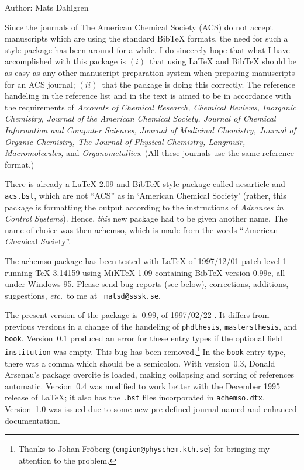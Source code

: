 \documentclass{article}
\begin{document}
\label{achemsodoc}Author: Mats Dahlgren

Since the journals of The American Chemical Society (ACS) do not accept
manuscripts which are using the standard BibTeX formats, the need for such a
style package has been around for a while. I do sincerely hope that what I
have accomplished with this package is $(i)$~that using \LaTeX{} and BibTeX
should be as easy as any other manuscript preparation system when preparing
manuscripts for an ACS journal; $(ii)$~that the package is doing this
correctly. The reference handeling in the reference list and in the text is
aimed to be in accordance with the requirements of \textit{Accounts of
Chemical Research, Chemical Reviews, Inorganic Chemistry, Journal of the
American Chemical Society, Journal of Chemical Information and Computer
Sciences, Journal of Medicinal Chemistry, Journal of Organic Chemistry, The
Journal of Physical Chemistry, Langmuir, Macromolecules,} and \textit{%
Organometallics}. (All these journals use the same reference format.)

There is already a LaTeX 2.09 and BibTeX style package called \textsf{%
acsarticle} and \texttt{acs.bst}, which are not ``ACS'' as in `American
Chemical Society' (rather, this package is formatting the output according
to the instructions of \textit{Advances in Control Systems}). Hence, \textit{%
this} new package had to be given another name. The name of choice was then 
\textsf{achemso}, which is made from the words ``\textit{A}merican \textit{%
Chem}ical \textit{So}ciety''.

The \textsf{achemso} package has been tested with \LaTeX{} of 1997/12/01
patch level 1 running \TeX{} 3.14159 using MiK\TeX{} 1.09 containing BibTeX
version 0.99c, all under Windows 95. Please send bug reports (see below),
corrections, additions, suggestions, \textit{etc.}\ to me at \texttt{%
matsd@sssk.se}.

The present version of the package is~0.99{}, of 1997/02/22 . It differs
from previous versions in a change of the handeling of \texttt{phdthesis}, 
\texttt{mastersthesis}, and \texttt{book}. Version~0.1 produced an error for
these entry types if the optional field \texttt{institution} was empty. This
bug has been removed.\footnote{%
Thanks to Johan Fr\"{o}berg (\texttt{emgion@physchem.kth.se}) for bringing
my attention to the problem.} In the \texttt{book} entry type, there was a
comma which should be a semicolon. With version~0.3, Donald Arsenau's
package \textsf{overcite} is loaded, making collapsing and sorting of
references automatic. Version~0.4 was modified to work better with the
December 1995 release of \LaTeX{}; it also has the \texttt{.bst} files
incorporated in \texttt{achemso.dtx}. Version~1.0 was issued due to some new
pre-defined journal named and enhanced documentation.
\end{document}
